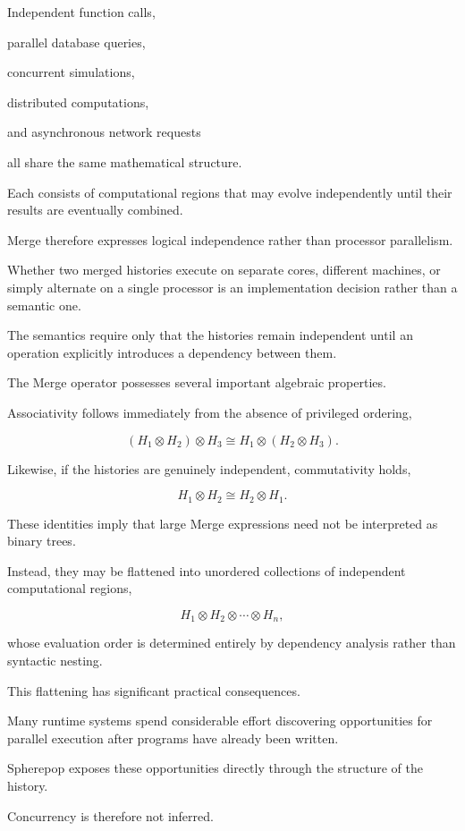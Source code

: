 \documentclass[12pt,oneside]{article}
\theoremstyle{definition}
\theoremstyle{remark}
\begin{document}
Independent function calls,

parallel database queries,

concurrent simulations,

distributed computations,

and asynchronous network requests

all share the same mathematical structure.

Each consists of computational regions that may evolve independently until
their results are eventually combined.

Merge therefore expresses logical independence rather than processor
parallelism.

Whether two merged histories execute on separate cores, different machines, or
simply alternate on a single processor is an implementation decision rather
than a semantic one.

The semantics require only that the histories remain independent until an
operation explicitly introduces a dependency between them.

The Merge operator possesses several important algebraic properties.

Associativity follows immediately from the absence of privileged ordering,

\[
(H_1 \otimes H_2)\otimes H_3
\cong
H_1\otimes(H_2\otimes H_3).
\]

Likewise, if the histories are genuinely independent, commutativity holds,

\[
H_1\otimes H_2
\cong
H_2\otimes H_1.
\]

These identities imply that large Merge expressions need not be interpreted as
binary trees.

Instead, they may be flattened into unordered collections of independent
computational regions,

\[
H_1\otimes H_2\otimes\cdots\otimes H_n,
\]

whose evaluation order is determined entirely by dependency analysis rather
than syntactic nesting.

This flattening has significant practical consequences.

Many runtime systems spend considerable effort discovering opportunities for
parallel execution after programs have already been written.

Spherepop exposes these opportunities directly through the structure of the
history.

Concurrency is therefore not inferred.
\end{document}
